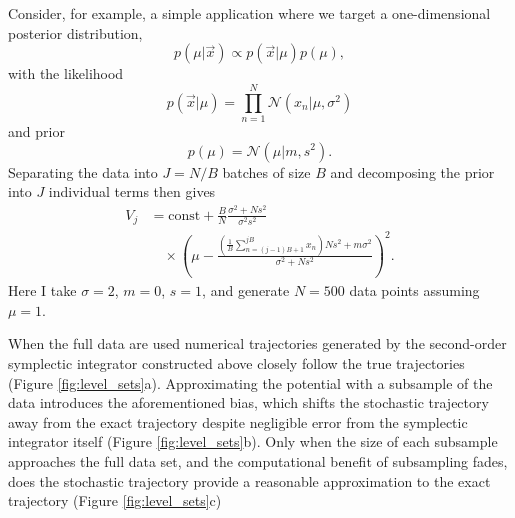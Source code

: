 \documentclass{article}
\begin{document}
Consider, for example, a simple application where we target a one-dimensional
posterior distribution,
%
\begin{equation} \label{posterior}
p \! \left( \mu | \vec{x} \right) \propto p \! \left( \vec{x} | \mu \right) p \! \left( \mu \right),
\end{equation}
%
with the likelihood
%
\begin{equation*}
p \! \left( \vec{x} | \mu \right) = \prod_{n = 1}^{N} \mathcal{N} \! \left( x_{n} | \mu, \sigma^{2} \right)
\end{equation*}
%
and prior
%
\begin{equation*}
p \! \left( \mu \right) = \mathcal{N} \! \left( \mu | m, s^{2} \right). 
\end{equation*}
%
Separating the data into $J = N / B$ batches of size $B$ and decomposing the
prior into $J$ individual terms then gives
%
\begin{align*}
V_{j} &= \mathrm{const} + 
\frac{B}{N} \frac{ \sigma^{2} + N s^{2}  }{ \sigma^{2} s^{2} }
\\
& \quad
\times \left( \mu - 
\frac{ \left( \frac{1}{B} \sum_{n = (j - 1) B + 1}^{j B} x_{n} \right) N s^{2}  + m \sigma^{2} }
{ \sigma^{2} + N s^{2} } 
\right)^{2}.
\end{align*}
%
Here I take $\sigma = 2$, $m = 0$, $s = 1$, and generate $N = 500$ data points
assuming $\mu = 1$.

When the full data are used numerical trajectories generated by the second-order 
symplectic integrator constructed above closely follow the true trajectories 
(Figure \ref{fig:level_sets}a).  Approximating the potential with a subsample of the data 
introduces the aforementioned bias, which shifts the stochastic trajectory away from the 
exact trajectory despite negligible error from the symplectic integrator itself (Figure \ref{fig:level_sets}b).
Only when the size of each subsample approaches the full data set, and the computational
benefit of subsampling fades, does the stochastic trajectory provide a reasonable
approximation to the exact trajectory (Figure \ref{fig:level_sets}c)
\end{document}
